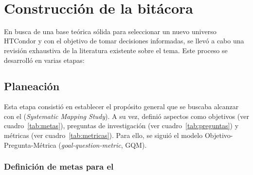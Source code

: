 \label{cap:revisionLiteratura}

\mbox{}\\
\section{Construcción de la bitácora}

En busca de una base teórica sólida para seleccionar un nuevo universo HTCondor y con el objetivo de tomar decisiones informadas, se llevó a cabo una revisión exhaustiva de la literatura existente sobre el tema. Este proceso se desarrolló en varias etapas:


\subsection{Planeación}

Esta etapa consistió en establecer el propósito general que se buscaba alcanzar con el \SMS (\textit{Systematic Mapping Study}).
A su vez, definió aspectos como objetivos (ver cuadro~\ref{tab:metas}), preguntas de investigación (ver cuadro~\ref{tab:preguntas}) y métricas (ver cuadro~\ref{tab:metricas}). Para ello, se siguió el modelo
Objetivo-Pregunta-Métrica (\textit{goal-question-metric}, GQM).

\subsubsection{Definición de metas para el \SMS}

